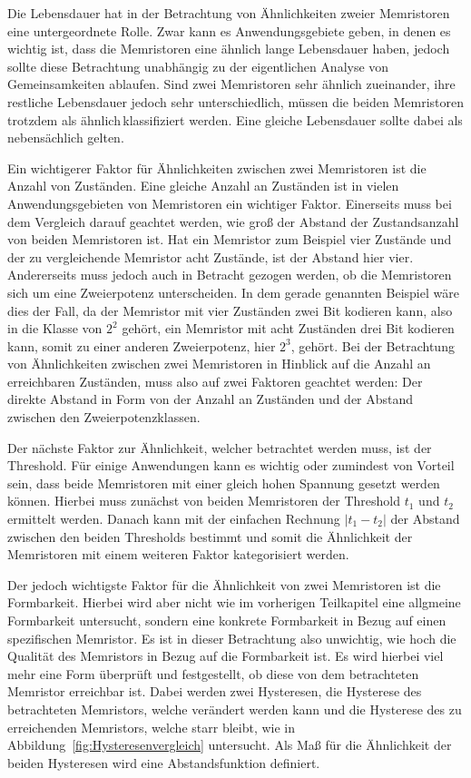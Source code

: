 Die Lebensdauer hat in der Betrachtung von Ähnlichkeiten zweier Memristoren eine untergeordnete Rolle. Zwar kann es Anwendungsgebiete geben, in denen es wichtig ist, dass die Memristoren eine ähnlich lange Lebensdauer haben, jedoch sollte diese Betrachtung unabhängig zu der eigentlichen Analyse von Gemeinsamkeiten ablaufen. Sind zwei Memristoren sehr ähnlich zueinander, ihre restliche Lebensdauer jedoch sehr unterschiedlich, müssen die beiden Memristoren trotzdem als \glqq ähnlich\grqq\,klassifiziert werden. Eine gleiche Lebensdauer sollte dabei als nebensächlich gelten.

Ein wichtigerer Faktor für Ähnlichkeiten zwischen zwei Memristoren ist die Anzahl von Zuständen. Eine gleiche Anzahl an Zuständen ist in vielen Anwendungsgebieten von Memristoren ein wichtiger Faktor. Einerseits muss bei dem Vergleich darauf geachtet werden, wie groß der Abstand der Zustandsanzahl von beiden Memristoren ist. Hat ein Memristor zum Beispiel vier Zustände und der zu vergleichende Memristor acht Zustände, ist der Abstand hier vier. Andererseits muss jedoch auch in Betracht gezogen werden, ob die Memristoren sich um eine Zweierpotenz unterscheiden. In dem gerade genannten Beispiel wäre dies der Fall, da der Memristor mit vier Zuständen zwei Bit kodieren kann, also in die Klasse von $2^2$ gehört, ein Memristor mit acht Zuständen drei Bit kodieren kann, somit zu einer anderen Zweierpotenz, hier $2^3$, gehört. Bei der Betrachtung von Ähnlichkeiten zwischen zwei Memristoren in Hinblick auf die Anzahl an erreichbaren Zuständen, muss also auf zwei Faktoren geachtet werden: Der direkte Abstand in Form von der Anzahl an Zuständen und der Abstand zwischen den \glqq Zweierpotenzklassen\grqq.

Der nächste Faktor zur Ähnlichkeit, welcher betrachtet werden muss, ist der Threshold. Für einige Anwendungen kann es wichtig oder zumindest von Vorteil sein, dass beide Memristoren mit einer gleich hohen Spannung gesetzt werden können. Hierbei muss zunächst von beiden Memristoren der Threshold $t_1$ und $t_2$ ermittelt werden. Danach kann mit der einfachen Rechnung $| t_1 - t_2 |$ der Abstand zwischen den beiden Thresholds bestimmt und somit die Ähnlichkeit der Memristoren mit einem weiteren Faktor kategorisiert werden.

Der jedoch wichtigste Faktor für die Ähnlichkeit von zwei Memristoren ist die Formbarkeit. Hierbei wird aber nicht wie im vorherigen Teilkapitel eine allgmeine Formbarkeit untersucht, sondern eine konkrete Formbarkeit in Bezug auf einen spezifischen Memristor. Es ist in dieser Betrachtung also unwichtig, wie hoch die Qualität des Memristors in Bezug auf die Formbarkeit ist. Es wird hierbei viel mehr eine Form überprüft und festgestellt, ob diese von dem betrachteten Memristor erreichbar ist. Dabei werden zwei Hysteresen, die Hysterese des betrachteten Memristors, welche verändert werden kann und die Hysterese des zu erreichenden Memristors, welche starr bleibt, wie in Abbildung~\ref{fig:Hysteresenvergleich} untersucht. Als Maß für die Ähnlichkeit der beiden Hysteresen wird eine Abstandsfunktion definiert.

